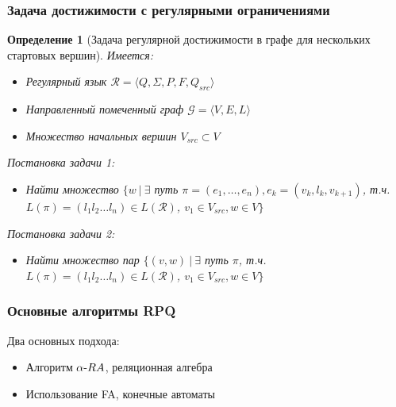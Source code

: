 \documentclass{beamer}
\newtheorem{rudefinition}{Определение}
\begin{document}

\begin{frame}
  \frametitle{Задача достижимости с регулярными ограничениями}
  \begin{rudefinition}[Задача регулярной достижимости в графе для нескольких стартовых вершин]
    Имеется:
    \begin{itemize}
        \item Регулярный язык $\mathcal{R}=\langle Q, \Sigma, P, F, Q_{src} \rangle$
        \item Направленный помеченный граф $\mathcal{G}=\langle V, E, L \rangle$
        \item Множество начальных вершин $V_{src}\subset V$
    \end{itemize}
    Постановка задачи 1:
    \begin{itemize}
        \item Найти множество $\{w~|~\exists$ путь $\pi = (e_1, \dots, e_n), e_k = (v_k, l_k, v_{k+1})$, т.ч. $ L(\pi)=(l_1l_2 \dots l_n) \in L(\mathcal{R})$, $v_1 \in V_{src}, w \in V\}$
    \end{itemize}
    Постановка задачи 2:
    \begin{itemize}
        \item Найти множество пар $\{(v, w)~|~\exists$ путь $\pi$, т.ч. $ L(\pi)=(l_1l_2 \dots l_n) \in L(\mathcal{R})$, $v_1 \in V_{src}, w \in V\}$
    \end{itemize}
  \end{rudefinition}
\end{frame}


\begin{frame}[fragile]
  \frametitle{Основные алгоритмы RPQ}
  Два основных подхода:
  \begin{itemize}
    \item Алгоритм $\alpha{\text -}RA$, реляционная алгебра
    \item Использование FA, конечные автоматы
  \end{itemize}
\end{frame}
\end{document}

